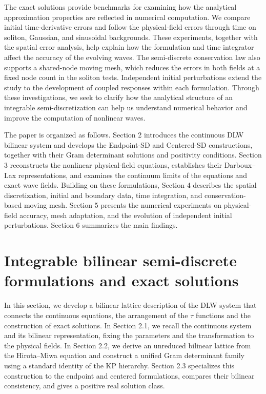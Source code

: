 \documentclass{article}
\theoremstyle{plain}
\theoremstyle{definition}
\begin{document}
The exact solutions provide benchmarks for examining how the analytical approximation properties are reflected in numerical computation. We compare initial time-derivative errors and follow the physical-field errors through time on soliton, Gaussian, and sinusoidal backgrounds. These experiments, together with the spatial error analysis, help explain how the formulation and time integrator affect the accuracy of the evolving waves. The semi-discrete conservation law also supports a shared-node moving mesh, which reduces the errors in both fields at a fixed node count in the soliton tests. Independent initial perturbations extend the study to the development of coupled responses within each formulation. Through these investigations, we seek to clarify how the analytical structure of an integrable semi-discretization can help us understand numerical behavior and improve the computation of nonlinear waves.

The paper is organized as follows. Section 2 introduces the continuous DLW bilinear system and develops the Endpoint-SD and Centered-SD constructions, together with their Gram determinant solutions and positivity conditions. Section 3 reconstructs the nonlinear physical-field equations, establishes their Darboux–Lax representations, and examines the continuum limits of the equations and exact wave fields. Building on these formulations, Section 4 describes the spatial discretization, initial and boundary data, time integration, and conservation-based moving mesh. Section 5 presents the numerical experiments on physical-field accuracy, mesh adaptation, and the evolution of independent initial perturbations. Section 6 summarizes the main findings.


\FloatBarrier
\section{Integrable bilinear semi-discrete formulations and exact solutions}

In this section, we develop a bilinear lattice description of the DLW system that connects the continuous equations, the arrangement of the \(\tau\) functions and the construction of exact solutions. In Section 2.1, we recall the continuous system and its bilinear representation, fixing the parameters and the transformation to the physical fields. In Section 2.2, we derive an unreduced bilinear lattice from the Hirota–Miwa equation and construct a unified Gram determinant family using a standard identity of the KP hierarchy. Section 2.3 specializes this construction to the endpoint and centered formulations, compares their bilinear consistency, and gives a positive real solution class.
\end{document}

